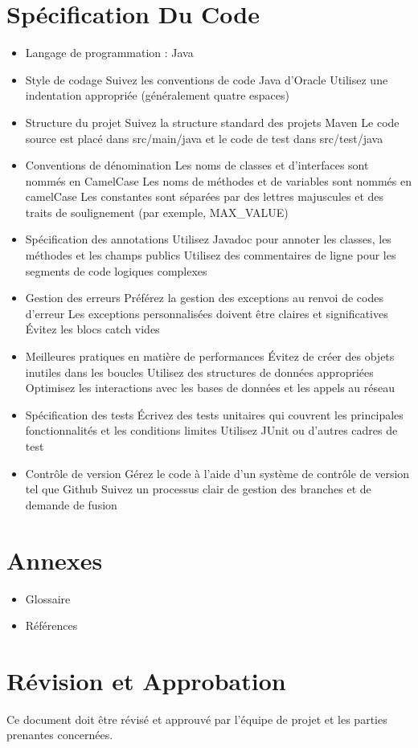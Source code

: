 \documentclass{article}
\begin{document}
\section{Spécification Du Code}
\begin{itemize}
    \item Langage de programmation : Java
    \item Style de codage 
    \subitem Suivez les conventions de code Java d'Oracle
    \subitem Utilisez une indentation appropriée (généralement quatre espaces)
    \item Structure du projet
    \subitem Suivez la structure standard des projets Maven
    \subitem Le code source est placé dans src/main/java et le code de test dans src/test/java
    \item Conventions de dénomination
    \subitem Les noms de classes et d'interfaces sont nommés en CamelCase
    \subitem Les noms de méthodes et de variables sont nommés en camelCase
    \subitem Les constantes sont séparées par des lettres majuscules et des traits de soulignement (par exemple, MAX\_VALUE)
    \item Spécification des annotations
    \subitem Utilisez Javadoc pour annoter les classes, les méthodes et les champs publics
    \subitem Utilisez des commentaires de ligne pour les segments de code logiques complexes
    \item Gestion des erreurs
    \subitem Préférez la gestion des exceptions au renvoi de codes d'erreur
    \subitem Les exceptions personnalisées doivent être claires et significatives
    \subitem Évitez les blocs catch vides
    \item Meilleures pratiques en matière de performances
    \subitem Évitez de créer des objets inutiles dans les boucles
    \subitem Utilisez des structures de données appropriées
    \subitem Optimisez les interactions avec les bases de données et les appels au réseau
    \item Spécification des tests
    \subitem Écrivez des tests unitaires qui couvrent les principales fonctionnalités et les conditions limites
    \subitem Utilisez JUnit ou d'autres cadres de test
    \item Contrôle de version
    \subitem Gérez le code à l'aide d'un système de contrôle de version tel que Github
    \subitem Suivez un processus clair de gestion des branches et de demande de fusion
\end{itemize}

\section{Annexes}
\begin{itemize}
    \item Glossaire
    \item Références
\end{itemize}

\section{Révision et Approbation}
Ce document doit être révisé et approuvé par l'équipe de projet et les parties prenantes concernées.
\end{document}
